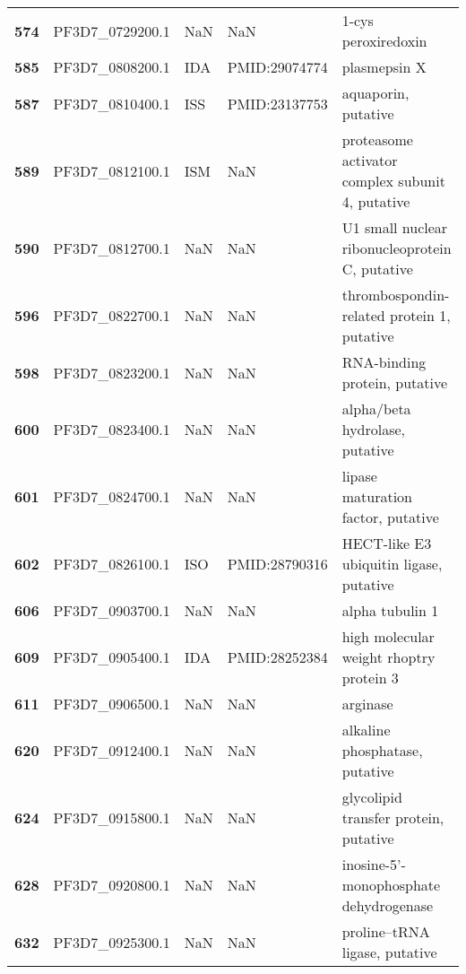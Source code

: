 \begin{longtable}{lllll}
\textbf{574} &  PF3D7\_0729200.1 &      NaN &            NaN &                                1-cys peroxiredoxin \\
\textbf{585} &  PF3D7\_0808200.1 &      IDA &  PMID:29074774 &                                       plasmepsin X \\
\textbf{587} &  PF3D7\_0810400.1 &      ISS &  PMID:23137753 &                                aquaporin, putative \\
\textbf{589} &  PF3D7\_0812100.1 &      ISM &            NaN &   proteasome activator complex subunit 4, putative \\
\textbf{590} &  PF3D7\_0812700.1 &      NaN &            NaN &     U1 small nuclear ribonucleoprotein C, putative \\
\textbf{596} &  PF3D7\_0822700.1 &      NaN &            NaN &         thrombospondin-related protein 1, putative \\
\textbf{598} &  PF3D7\_0823200.1 &      NaN &            NaN &                      RNA-binding protein, putative \\
\textbf{600} &  PF3D7\_0823400.1 &      NaN &            NaN &                     alpha/beta hydrolase, putative \\
\textbf{601} &  PF3D7\_0824700.1 &      NaN &            NaN &                 lipase maturation factor, putative \\
\textbf{602} &  PF3D7\_0826100.1 &      ISO &  PMID:28790316 &            HECT-like E3 ubiquitin ligase, putative \\
\textbf{606} &  PF3D7\_0903700.1 &      NaN &            NaN &                                    alpha tubulin 1 \\
\textbf{609} &  PF3D7\_0905400.1 &      IDA &  PMID:28252384 &            high molecular weight rhoptry protein 3 \\
\textbf{611} &  PF3D7\_0906500.1 &      NaN &            NaN &                                           arginase \\
\textbf{620} &  PF3D7\_0912400.1 &      NaN &            NaN &                     alkaline phosphatase, putative \\
\textbf{624} &  PF3D7\_0915800.1 &      NaN &            NaN &              glycolipid transfer protein, putative \\
\textbf{628} &  PF3D7\_0920800.1 &      NaN &            NaN &             inosine-5'-monophosphate dehydrogenase \\
\textbf{632} &  PF3D7\_0925300.1 &      NaN &            NaN &                     proline--tRNA ligase, putative \\

\end{longtable}
